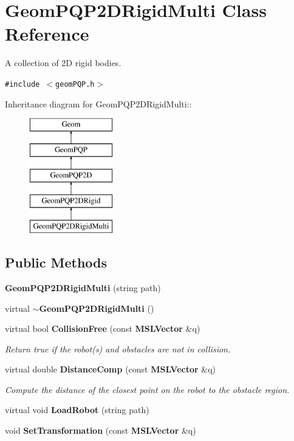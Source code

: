 \section{Geom\-PQP2DRigid\-Multi  Class Reference}
\label{class_GeomPQP2DRigidMulti}
A collection of 2D rigid bodies. 


{\tt \#include $<$geom\-PQP.h$>$}

Inheritance diagram for Geom\-PQP2DRigid\-Multi::\begin{figure}[H]
\begin{center}
\leavevmode
\includegraphics[height=5cm]{class_GeomPQP2DRigidMulti}
\end{center}
\end{figure}
\subsection*{Public Methods}
\begin{CompactItemize}
\item 
{\bf Geom\-PQP2DRigid\-Multi} (string path)
\item 
virtual {\bf $\sim$Geom\-PQP2DRigid\-Multi} ()
\item 
virtual bool {\bf Collision\-Free} (const {\bf MSLVector} \&q)
\begin{CompactList}\small\item\em Return true if the robot(s) and obstacles are not in collision.\item\end{CompactList}\item 
virtual double {\bf Distance\-Comp} (const {\bf MSLVector} \&q)
\begin{CompactList}\small\item\em Compute the distance of the closest point on the robot to the obstacle region.\item\end{CompactList}\item 
virtual void {\bf Load\-Robot} (string path)
\item 
void {\bf Set\-Transformation} (const {\bf MSLVector} \&q)
\end{CompactItemize}
